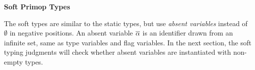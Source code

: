 \documentclass{article}
\begin{document}
\noindent {}
\begin{mathpar}






\end{mathpar}

\noindent \textbf{Soft Primop Types}

The soft types are similar to the static types, but use \emph{absent variables}
 instead of $\emptyset$ in negative positions.
An absent variable $\absent{\alpha}$ is an identifier drawn from an infinite set,
 same as type variables and flag variables.
In the next section, the soft typing judgments will check whether absent
 variables are instantiated with non-empty types.
\end{document}
